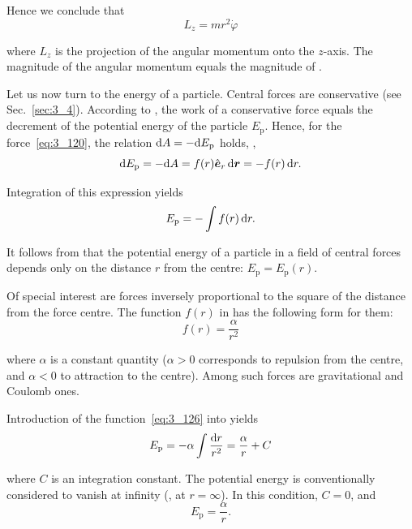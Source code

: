 \noindent
Hence we conclude that
\begin{equation}\label{eq:3_124}
L_z = mr^2\dot{\varphi}
\end{equation}

\noindent
where $L_z$ is the projection of the angular momentum onto the $z$-axis. The magnitude of the angular momentum equals the magnitude of .

Let us now turn to the energy of a particle. Central forces are conservative (see Sec.~\ref{sec:3_4}). According to , the work of a conservative force equals the decrement of the potential energy of the particle $E_{\text{p}}$. Hence, for the force~\eqref{eq:3_120}, the relation $\mathrm{d} A=-\mathrm{d} E_{\text{p}}$ holds, \ie,
\begin{equation*}
\mathrm{d} E_{\text{p}} = -\mathrm{d} A = f(r)\hat{\boldsymbol{e}}_{r}\,\mathrm{d}\boldsymbol{r} = -f(r)\,\mathrm{d} r.
\end{equation*}

\noindent
Integration of this expression yields
\begin{equation}\label{eq:3_125}
E_{\text{p}} = -\int f(r)\,\mathrm{d} r.
\end{equation}

\noindent
It follows from  that the potential energy of a particle in a field of central forces depends only on the distance $r$ from the centre: $E_{\text{p}}=E_{\text{p}}(r)$.

Of special interest are forces inversely proportional to the square of the distance from the force centre. The function $f(r)$ in  has the following form for them:
\begin{equation}\label{eq:3_126}
f(r) = \frac{\alpha}{r^2}
\end{equation}

\noindent
where $\alpha$ is a constant quantity ($\alpha>0$ corresponds to repulsion from the centre, and $\alpha<0$ to attraction to the centre). Among such forces are gravitational and Coulomb ones.

Introduction of the function~\eqref{eq:3_126} into  yields
\begin{equation*}
E_{\text{p}} = -\alpha \int \frac{\mathrm{d} r}{r^2} = \frac{\alpha}{r} + C
\end{equation*}

\noindent
where $C$ is an integration constant. The potential energy is conventionally considered to vanish at infinity (\ie, at $r=\infty$). In this condition, $C=0$, and
\begin{equation}\label{eq:3_127}
E_{\text{p}} = \frac{\alpha}{r}.
\end{equation}

